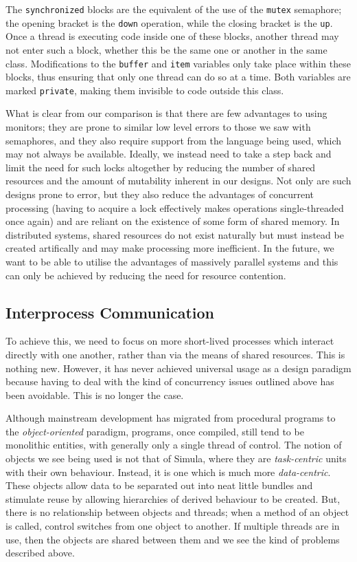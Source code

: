 The \texttt{synchronized} blocks are the equivalent of the use of the
\texttt{mutex} semaphore; the opening bracket is the \texttt{down}
operation, while the closing bracket is the \texttt{up}.  Once a
thread is executing code inside one of these blocks, another thread
may not enter such a block, whether this be the same one or another in
the same class.  Modifications to the \texttt{buffer} and
\texttt{item} variables only take place within these blocks, thus
ensuring that only one thread can do so at a time.  Both variables are
marked \texttt{private}, making them invisible to code outside this
class.

What is clear from our comparison is that there are few advantages to
using monitors; they are prone to similar low level errors to those we
saw with semaphores, and they also require support from the language
being used, which may not always be available.  Ideally, we instead
need to take a step back and limit the need for such locks altogether
by reducing the number of shared resources and the amount of
mutability inherent in our designs.  Not only are such designs prone
to error, but they also reduce the advantages of concurrent processing
(having to acquire a lock effectively makes operations single-threaded
once again) and are reliant on the existence of some form of shared
memory.  In distributed systems, shared resources do not exist
naturally but must instead be created artifically and may make
processing more inefficient.  In the future, we want to be able to
utilise the advantages of massively parallel systems and this can only
be achieved by reducing the need for resource contention.

\subsection{Interprocess Communication}
\label{ipc}

To achieve this, we need to focus on more short-lived processes which
interact directly with one another, rather than via the means of
shared resources.  This is nothing new.  However, it has never
achieved universal usage as a design paradigm because having to deal
with the kind of concurrency issues outlined above has been avoidable.
This is no longer the case.

Although mainstream development has migrated from procedural programs
to the \emph{object-oriented} paradigm, programs, once compiled, still
tend to be monolithic entities, with generally only a single thread of
control.  The notion of objects we see being used is not that of
Simula\cite{simula}, where they are \emph{task-centric} units with
their own behaviour.  Instead, it is one which is much more
\emph{data-centric}.  These objects allow data to be separated out
into neat little bundles and stimulate reuse by allowing hierarchies
of derived behaviour to be created.  But, there is no relationship
between objects and threads; when a method of an object is called,
control switches from one object to another.  If multiple threads are
in use, then the objects are shared between them and we see the kind
of problems described above.


